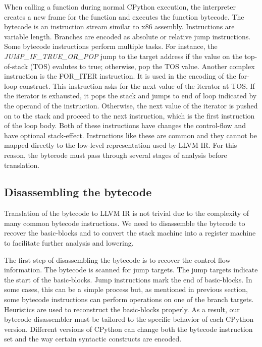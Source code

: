 \documentclass{acm_proc_article-sp}
\begin{document}
When calling a function during normal CPython execution, the
interpreter creates a new frame for the function and executes the
function bytecode.  The bytecode is an instruction stream similar to
x86 assembly.  Instructions are variable length. Branches are encoded
as absolute or relative jump instructions. Some bytecode instructions
perform multiple tasks.  For instance, the
\textit{JUMP\_IF\_TRUE\_OR\_POP} jump to the target address if the
value on the top-of-stack (TOS) evalutes to true; otherwise, pop the
TOS value.  Another complex instruction is the FOR\_ITER instruction.
It is used in the encoding of the for-loop construct.  This
instruction asks for the next value of the iterator at TOS.  If the
iterator is exhausted, it pops the stack and jumps to end of loop
indicated by the operand of the instruction.  Otherwise, the next
value of the iterator is pushed on to the stack and proceed to the
next instruction, which is the first instruction of the loop
body. Both of these instructions have changes the control-flow and
have optional stack-effect. \cite{pythondoc:dis} Instructions like
these are common and they cannot be mapped directly to the low-level
representation used by LLVM IR.  For this reason, the bytecode must
pass through several stages of analysis before translation.

\subsection{Disassembling the bytecode}

Translation of the bytecode to LLVM IR is not trivial due to the
complexity of many common bytecode instructions.  We need to disassemble
the bytecode to recover the basic-blocks and to convert the stack machine into
a register machine to facilitate further analysis and lowering.

The first step of disassembling the bytecode is to recover the control
flow information. The bytecode is scanned for jump targets. The jump
targets indicate the start of the basic-blocks.  Jump instructions
mark the end of basic-blocks. In some cases, this can be a simple
process but, as mentioned in previous section, some bytecode
instructions can perform operations on one of the branch targets.
Heuristics are used to reconstruct the basic-blocks properly. As a
result, our bytecode disassembler must be tailored to the specific
behavior of each CPython version.  Different versions of CPython can
change both the bytecode instruction set and the way certain syntactic
constructs are encoded.
\end{document}
